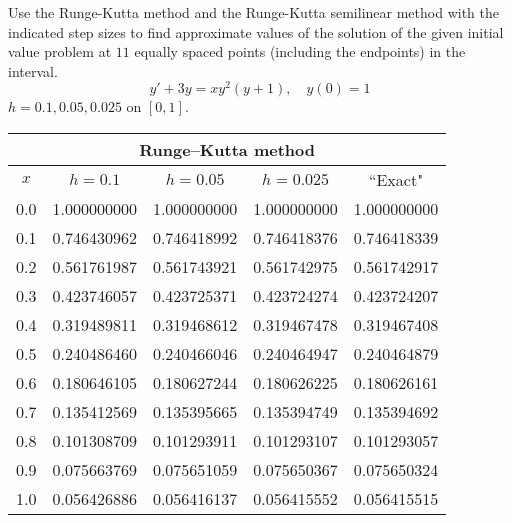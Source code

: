 \documentclass{ximera}
\begin{document}
\begin{problem}\label{exer:3.3.20} Use the Runge-Kutta method and the Runge-Kutta semilinear method with the indicated step sizes to find approximate values of the solution of the given initial value problem at $11$ equally spaced points (including the endpoints) in the interval.
$$y'+3y=xy^2(y+1),\quad y(0)=1$$
$h=0.1,0.05,0.025$ on $[0,1]$.

\begin{solution}
    {\small
\begin{tabular}{|c|r|r|r|r|}
\hline
\multicolumn{5}{|c|}{Runge--Kutta method}\\\hline
\multicolumn{1}{|c|}{$x$}&
\multicolumn{1}{|c|}{$h=0.1$}&
\multicolumn{1}{|c|}{$h=0.05$}&
\multicolumn{1}{|c|}{$h=0.025$}&
\multicolumn{1}{|c|}{``Exact"}\\ \hline
0.0 & 1.000000000 & 1.000000000 & 1.000000000 & 1.000000000 \\
0.1 & 0.746430962 & 0.746418992 & 0.746418376 & 0.746418339 \\
0.2 & 0.561761987 & 0.561743921 & 0.561742975 & 0.561742917 \\
0.3 & 0.423746057 & 0.423725371 & 0.423724274 & 0.423724207 \\
0.4 & 0.319489811 & 0.319468612 & 0.319467478 & 0.319467408 \\
0.5 & 0.240486460 & 0.240466046 & 0.240464947 & 0.240464879 \\
0.6 & 0.180646105 & 0.180627244 & 0.180626225 & 0.180626161 \\
0.7 & 0.135412569 & 0.135395665 & 0.135394749 & 0.135394692 \\
0.8 & 0.101308709 & 0.101293911 & 0.101293107 & 0.101293057 \\
0.9 & 0.075663769 & 0.075651059 & 0.075650367 & 0.075650324 \\
1.0 & 0.056426886 & 0.056416137 & 0.056415552 & 0.056415515 \\
\hline
\end{tabular}}


\end{solution}
\end{problem}
\end{document}
